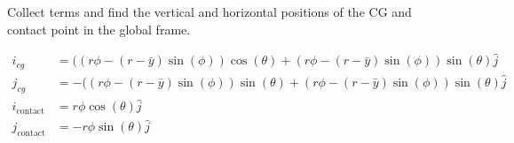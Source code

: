 Collect terms and find the vertical and horizontal positions of the CG and contact point in the global frame.

\begin{solution}
\begin{align*}
    i_{c g} &= ((r \phi-(r-\bar{y}) \sin (\phi))\cos (\theta) + (r \phi-(r-\bar{y}) \sin (\phi))\sin (\theta) \hat{j} \\
    j_{c g} &= -((r \phi - (r-\bar{y}) \sin (\phi))\sin(\theta) + (r \phi-(r-\bar{y}) \sin (\phi))\sin (\theta) \hat{j} \\
    i_{\text {contact}} &= r\phi\cos(\theta)\hat{j} \\
    j_{\text {contact}} &= -r\phi\sin(\theta)\hat{j}
\end{align*}
\end{solution}